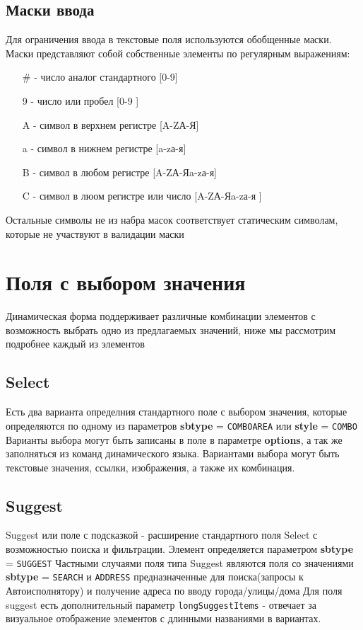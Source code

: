 \documentclass[../index.tex]{subfiles}
\begin{document}
	\subsection{Маски ввода}
		Для ограничения ввода в текстовые поля используются обобщенные маски. Маски представляют собой собственные элементы по регулярным выражениям:
		\begin{enumerate}
			\item[\#] - число аналог стандартного [0-9]
			\item[9] - число или пробел [0-9 ]
			\item[A] - символ в верхнем регистре [A-ZА-Я]
			\item[a] - символ в нижнем регистре [a-zа-я]
			\item[B] - символ в любом регистре [A-ZА-Яa-zа-я]
			\item[C] - символ в люом регистре или число [A-ZА-Яa-zа-я ]
		\end{enumerate}
		Остальные символы не из набра масок соответствует статическим символам, которые не участвуют в валидации маски
\section{Поля с выбором значения}
	Динамическая форма поддерживает различные комбинации элементов с возможность выбрать одно из предлагаемых значений, ниже мы рассмотрим подробнее каждый из элементов
\subsection{Select}
	Есть два варианта определния стандартного поле с выбором значения, которые определяются по одному из параметров \textbf{sbtype} = \verb|COMBOAREA| или \textbf{style} = \verb|COMBO|
	Варианты выбора могут быть записаны в поле в параметре \textbf{options}, а так же заполняться из команд динамического языка. Вариантами выбора могут быть текстовые значения, ссылки, изображения, а также их комбинация.
\subsection{Suggest}
	Suggest или поле с подсказкой - расширение стандартного поля Select с возможностью поиска и фильтрации.
	Элемент определяется параметром \textbf{sbtype} = \verb|SUGGEST|
	Частными случаями поля типа Suggest являются поля со значениями \textbf{sbtype} = \verb|SEARCH| и \verb|ADDRESS| предназначенные для поиска(запросы к Автоисполнятору) и получение адреса по вводу города/улицы/дома
	Для поля suggest есть дополнительный параметр \verb|longSuggestItems| - отвечает за визуальное отображение элементов с длинными названиями в вариантах.
\end{document}

